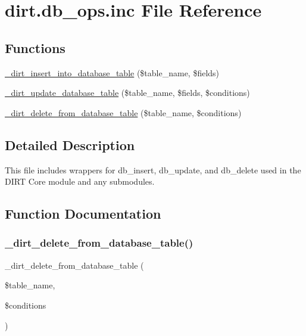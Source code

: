 \hypertarget{dirt_8db__ops_8inc}{}\section{dirt.\+db\+\_\+ops.\+inc File Reference}
\label{dirt_8db__ops_8inc}
\subsection*{Functions}
\begin{DoxyCompactItemize}
\item 
\mbox{\hyperlink{dirt_8db__ops_8inc_a0241ba24ec2d32a58f436163fbf1c445}{\+\_\+dirt\+\_\+insert\+\_\+into\+\_\+database\+\_\+table}} (\$table\+\_\+name, \$fields)
\item 
\mbox{\hyperlink{dirt_8db__ops_8inc_a50154f1e0c6d23a57c0826fcb666a3de}{\+\_\+dirt\+\_\+update\+\_\+database\+\_\+table}} (\$table\+\_\+name, \$fields, \$conditions)
\item 
\mbox{\hyperlink{dirt_8db__ops_8inc_a4c22459ce034b652f04c3f3b1bd081ee}{\+\_\+dirt\+\_\+delete\+\_\+from\+\_\+database\+\_\+table}} (\$table\+\_\+name, \$conditions)
\end{DoxyCompactItemize}


\subsection{Detailed Description}
This file includes wrappers for db\+\_\+insert, db\+\_\+update, and db\+\_\+delete used in the D\+I\+RT Core module and any submodules. 

\subsection{Function Documentation}
\mbox{\label{dirt_8db__ops_8inc_a4c22459ce034b652f04c3f3b1bd081ee}} 
\subsubsection{\texorpdfstring{\+\_\+dirt\+\_\+delete\+\_\+from\+\_\+database\+\_\+table()}{\_dirt\_delete\_from\_database\_table()}}
{\footnotesize\ttfamily \+\_\+dirt\+\_\+delete\+\_\+from\+\_\+database\+\_\+table (\begin{DoxyParamCaption}\item[{}]{\$table\+\_\+name,  }\item[{}]{\$conditions }\end{DoxyParamCaption})}


